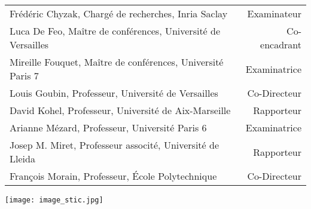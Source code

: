 \documentclass[a4paper, titlepage, 11pt]{book}
\makeatletter
\newcommand*{\cleartoleftpage}{%
  \clearpage
    \if@twoside
    \ifodd\c@page
      \hbox{}\newpage
      \if@twocolumn
        \hbox{}\newpage
      \fi
    \fi
  \fi
}
\makeatother
\begin{document}
\begin{breakbox}
\begin{tabular}{lr}
\noindent
Frédéric Chyzak, Chargé de recherches, Inria Saclay& Examinateur\\ 
Luca De Feo, Maître de conférences, Université de Versailles& Co-encadrant\\
Mireille Fouquet, Maître de conférences, Université Paris 7& Examinatrice\\
Louis Goubin, Professeur, Université de Versailles& Co-Directeur\\
David Kohel, Professeur, Université de Aix-Marseille& Rapporteur\\
Arianne Mézard, Professeur, Université Paris 6& Examinatrice\\
Josep M. Miret, Professeur associté, Université de Lleida& Rapporteur\\
François Morain, Professeur, \'Ecole Polytechnique& Co-Directeur\\

\end{tabular}

\vspace{6ex}

\end{breakbox}
\restoregeometry

%
%
%



\mainmatter
\pagestyle{fancy}

%




\cleartoleftpage
\pagestyle{empty}
\texttt{[image: image\_stic.jpg]}

\vspace{1ex}
\end{document}
